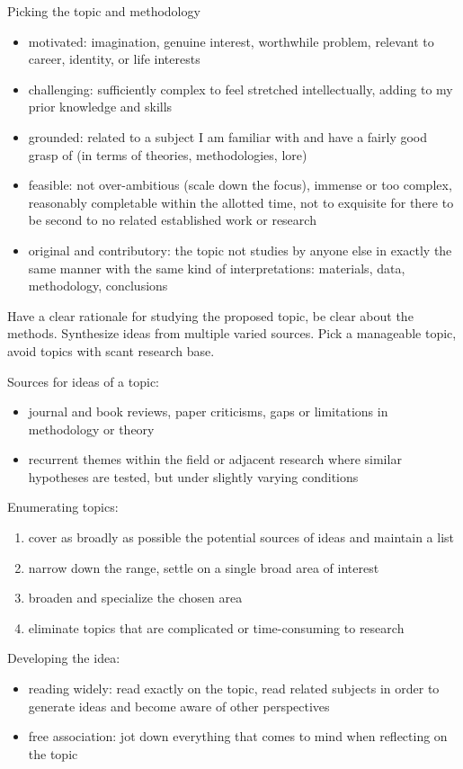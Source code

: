 \documentclass[10pt,a4paper,twocolumn]{article}
\begin{document}
Picking the topic and methodology
\begin{itemize}
  \item motivated: imagination, genuine interest, worthwhile problem, relevant to
  career, identity, or life interests
  \item challenging: sufficiently complex to feel stretched intellectually, adding to
  my prior knowledge and skills
  \item grounded: related to a subject I am familiar with and have a fairly good grasp
  of (in terms of theories, methodologies, lore)
  \item feasible: not over-ambitious (scale down the focus), immense or too complex,
  reasonably completable within the allotted time, not to exquisite for there to be
  second to no related established work or research
  \item original and contributory: the topic not studies by anyone else in exactly the
  same manner with the same kind of interpretations: materials, data, methodology, conclusions
\end{itemize}
Have a clear rationale for studying the proposed topic, be clear about the methods.
Synthesize ideas from multiple varied sources. Pick a manageable topic, avoid topics
with scant research base.

Sources for ideas of a topic:
\begin{itemize}
  \item journal and book reviews, paper criticisms, gaps or limitations in methodology
  or theory
  \item recurrent themes within the field or adjacent research where similar hypotheses
  are tested, but under slightly varying conditions
\end{itemize}

Enumerating topics:
\begin{enumerate}
  \item cover as broadly as possible the potential sources of ideas and maintain a list
  \item narrow down the range, settle on a single broad area of interest
  \item broaden and specialize the chosen area
  \item eliminate topics that are complicated or time-consuming to research
\end{enumerate}

Developing the idea:
\begin{itemize}
  \item reading widely: read exactly on the topic, read related subjects in order to
  generate ideas and become aware of other perspectives
  \item free association: jot down everything that comes to mind when reflecting on
  the topic
\end{itemize}
\end{document}
